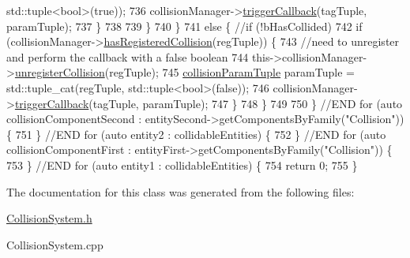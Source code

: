 \begin{DoxyCode}
      std::tuple<bool>(\textcolor{keyword}{true}));
736                         collisionManager->\hyperlink{class_collision_manager_aaf5aa4a712415540ce7313ec9e96dcef}{triggerCallback}(tagTuple, paramTuple);
737                     \}
738                     
739                 \}
740             \}
741             \textcolor{keywordflow}{else} \{ \textcolor{comment}{//if (!bHasCollided)}
742                 \textcolor{keywordflow}{if} (collisionManager->\hyperlink{class_collision_manager_a3dd0b50dcdee6bfd6ddcdaf7eec0c66b}{hasRegisteredCollision}(regTuple)) \{
743                     \textcolor{comment}{//need to unregister and perform the callback with a false boolean}
744                     this->collisionManager->\hyperlink{class_collision_manager_ad92675882f024a11730b1276b0949f04}{unregisterCollision}(regTuple);
745                     \hyperlink{_collision_manager_8h_aa4e5677732161da0be677d67bec17ea6}{collisionParamTuple} paramTuple = std::tuple\_cat(regTuple, 
      std::tuple<bool>(\textcolor{keyword}{false}));
746                     collisionManager->\hyperlink{class_collision_manager_aaf5aa4a712415540ce7313ec9e96dcef}{triggerCallback}(tagTuple, paramTuple);
747                 \}
748             \}
749 
750         \} \textcolor{comment}{//END for (auto collisionComponentSecond : entitySecond->getComponentsByFamily("Collision")) \{}
751         \} \textcolor{comment}{//END for (auto entity2 : collidableEntities) \{}
752     \} \textcolor{comment}{//END for (auto collisionComponentFirst : entityFirst->getComponentsByFamily("Collision")) \{}
753     \} \textcolor{comment}{//END for (auto entity1 : collidableEntities) \{}
754     \textcolor{keywordflow}{return} 0;
755 \}\end{DoxyCode}


The documentation for this class was generated from the following files\-:\begin{DoxyCompactItemize}
\item 
\hyperlink{_collision_system_8h}{Collision\-System.\-h}\item 
Collision\-System.\-cpp\end{DoxyCompactItemize}

